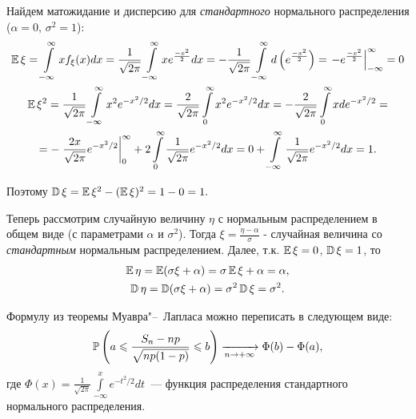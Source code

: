 Найдем матожидание и дисперсию для \textit{стандартного} нормального распределения ($\alpha = 0, \, \sigma^2 = 1$):
\begin{multline*}
    \operatorname{\mathbb{E}} \xi = 
    \int\limits_{-\infty}^{\infty} x f_{\xi}(x) dx =
    \frac{1}{\sqrt{2\pi}} \int\limits_{-\infty}^{\infty} x e^{\frac{-x^2}{2}} dx = 
    -\frac{1}{\sqrt{2\pi}} \int\limits_{-\infty}^{\infty} d\left( e^{\frac{-x^2}{2}}\right) = 
    \left. -e^{\frac{-x^2}{2}}\right|_{-\infty}^{\infty} = 0 \\
    \operatorname{\mathbb{E}} \xi^{2}=\frac{1}{\sqrt{2 \pi}} \int\limits_{-\infty}^{\infty} x^{2} e^{-x^{2} / 2} d x=\frac{2}{\sqrt{2 \pi}} \int\limits_{0}^{\infty} x^{2} e^{-x^{2} / 2} d x=-\frac{2}{\sqrt{2 \pi}} \int\limits_{0}^{\infty} x d e^{-x^{2} / 2}= \\
    =-\left.\frac{2 x}{\sqrt{2 \pi}} e^{-x^{2} / 2}\right|_{0} ^{\infty}+2 \int\limits_{0}^{\infty} \frac{1}{\sqrt{2 \pi}} e^{-x^{2} / 2} d x=0+\int\limits_{-\infty}^{\infty} \frac{1}{\sqrt{2 \pi}} e^{-x^{2} / 2} d x=1.
\end{multline*}

Поэтому $\operatorname{\mathbb{D}}\xi = \operatorname{\mathbb{E}} \xi^2 - (\operatorname{\mathbb{E}} \xi)^2 = 1 - 0 = 1.$

Теперь рассмотрим случайную величину $\eta$ с нормальным распределением в общем виде (с параметрами $\alpha$ и $\sigma^2$). Тогда $\xi = \frac{\eta - \alpha}{\sigma}$ - случайная величина со \textit{стандартным} нормальным распределением. Далее, т.к. $\operatorname{\mathbb{E}} \xi = 0$, $\operatorname{\mathbb{D}}\xi = 1$, то 
\begin{gather*}
    \operatorname{\mathbb{E}} \eta = \operatorname{\mathbb{E}} (\sigma \xi + \alpha) = \sigma \operatorname{\mathbb{E}} \xi + \alpha = \alpha, \\
    \operatorname{\mathbb{D}}\eta = \operatorname{\mathbb{D}}(\sigma \xi + \alpha) = \sigma^2 \operatorname{\mathbb{D}}\xi = \sigma^2.
\end{gather*}

\vspace{1cm}
\begin{rmrk}
Формулу из теоремы Муавра"--~Лапласа можно переписать в следующем виде:
\begin{equation*}
    \operatorname{\mathbb{P}}\left(a \leqslant \frac{S_{n}-n p}{\sqrt{n p(1-p)}} \leqslant b\right) \xrightarrow[n \to +\infty]{} \Phi(b) - \Phi(a),
\end{equation*}
где $\Phi(x)=\frac{1}{\sqrt{2 \pi}} \int\limits_{-\infty}^{x} e^{-t^{2} / 2} d t$~--- функция распределения стандартного нормального распределения.
\end{rmrk}
